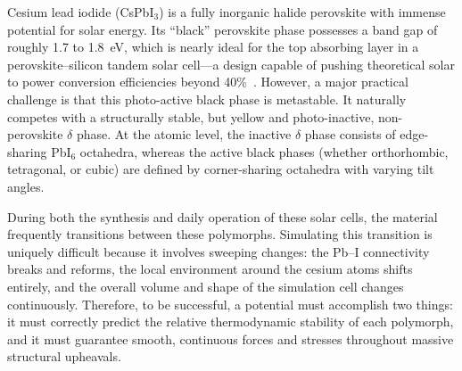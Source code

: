 \documentclass[aps,prx,preprint,notitlepage,superscriptaddress,nofootinbib,floatfix]{revtex4-2}
\begin{document}

Cesium lead iodide (CsPbI$_3$) is a fully inorganic halide perovskite with immense potential for solar energy. Its ``black'' perovskite phase possesses a band gap of roughly 1.7 to 1.8~eV, which is nearly ideal for the top absorbing layer in a perovskite--silicon tandem solar cell---a design capable of pushing theoretical solar to power conversion efficiencies beyond 40\%~\cite{bremner2016bandgaps,futscher2016tandem}. However, a major practical challenge is that this photo-active black phase is metastable. It naturally competes with a structurally stable, but yellow and photo-inactive, non-perovskite $\delta$ phase. At the atomic level, the inactive $\delta$ phase consists of edge-sharing PbI$_6$ octahedra, whereas the active black phases (whether orthorhombic, tetragonal, or cubic) are defined by corner-sharing octahedra with varying tilt angles.

During both the synthesis and daily operation of these solar cells, the material frequently transitions between these polymorphs. Simulating this transition is uniquely difficult because it involves sweeping changes: the Pb--I connectivity breaks and reforms, the local environment around the cesium atoms shifts entirely, and the overall volume and shape of the simulation cell changes continuously. Therefore, to be successful, a potential must accomplish two things: it must correctly predict the relative thermodynamic stability of each polymorph, and it must guarantee smooth, continuous forces and stresses throughout massive structural upheavals.
\end{document}
